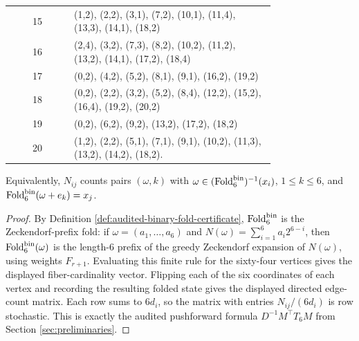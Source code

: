 \begin{proposition}
\begin{center}
\begin{tabular}{c|p{0.76\linewidth}}
15&(1,2), (2,2), (3,1), (7,2), (10,1), (11,4), (13,3), (14,1), (18,2)\\
16&(2,4), (3,2), (7,3), (8,2), (10,2), (11,2), (13,2), (14,1), (17,2), (18,4)\\
17&(0,2), (4,2), (5,2), (8,1), (9,1), (16,2), (19,2)\\
18&(0,2), (2,2), (3,2), (5,2), (8,4), (12,2), (15,2), (16,4), (19,2), (20,2)\\
19&(0,2), (6,2), (9,2), (13,2), (17,2), (18,2)\\
20&(1,2), (2,2), (5,1), (7,1), (9,1), (10,2), (11,3), (13,2), (14,2), (18,2).
\end{tabular}
\end{center}
Equivalently, \(N_{ij}\) counts pairs \((\omega,k)\) with \(\omega\in(\operatorname{Fold}_6^{\mathrm{bin}})^{-1}(x_i)\), \(1\le k\le6\), and \(\operatorname{Fold}_6^{\mathrm{bin}}(\omega+e_k)=x_j\).
\end{proposition}
\begin{proof}
By Definition \ref{def:audited-binary-fold-certificate}, \(\operatorname{Fold}_6^{\mathrm{bin}}\) is the Zeckendorf-prefix fold: if \(\omega=(a_1,\ldots,a_6)\) and \(N(\omega)=\sum_{i=1}^6 a_i2^{6-i}\), then \(\operatorname{Fold}_6^{\mathrm{bin}}(\omega)\) is the length-\(6\) prefix of the greedy Zeckendorf expansion of \(N(\omega)\), using weights \(F_{r+1}\).  Evaluating this finite rule for the sixty-four vertices gives the displayed fiber-cardinality vector.  Flipping each of the six coordinates of each vertex and recording the resulting folded state gives the displayed directed edge-count matrix.  Each row sums to \(6d_i\), so the matrix with entries \(N_{ij}/(6d_i)\) is row stochastic.  This is exactly the audited pushforward formula \(D^{-1}M^\top T_6M\) from Section \ref{sec:preliminaries}. \qedhere
\end{proof}

